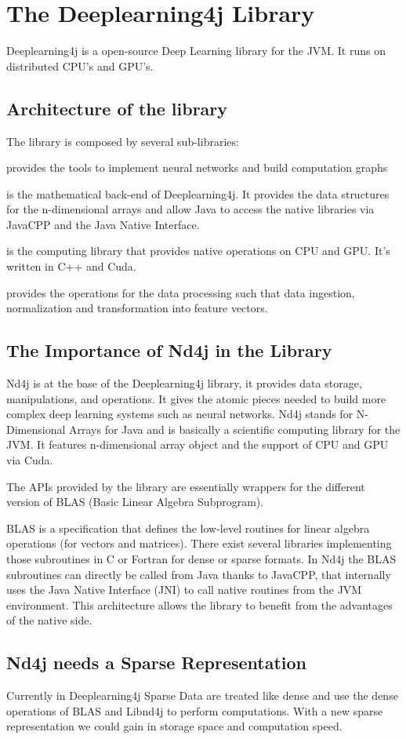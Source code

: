 \chapter{The Deeplearning4j Library}

Deeplearning4j is a open-source Deep Learning library for the {JVM}. It runs on distributed CPU's and GPU's.

\section{Architecture of the library}
The library is composed by several sub-libraries:

\begin{description}[leftmargin=!,labelwidth=\widthof{\bfseries Deeplearning4j}]
	\item [Deeplearning4j] provides the tools to implement neural networks and build computation graphs
	\item [Nd4j] is the mathematical back-end of Deeplearning4j. It provides the data structures for the n-dimensional arrays and allow Java to access the native libraries via JavaCPP and the Java Native Interface.
	\item [Libnd4j] is the computing library that provides native operations on CPU and GPU. It's written in C++ and Cuda.
	\item [Datavec] provides the operations for the data processing such that data ingestion, normalization and transformation into feature vectors.
\end{description}


\section{The Importance of Nd4j in the Library}

Nd4j is at the base of the Deeplearning4j library, it provides data storage, manipulations, and operations. It gives the atomic pieces needed to build more complex deep learning systems such as neural networks.  Nd4j stands for N-Dimensional Arrays for Java and is basically a scientific computing library for the JVM. It features n-dimensional array object and the support of CPU and GPU via Cuda. 

The APIs provided by the library are essentially wrappers for the different version of BLAS (Basic Linear Algebra Subprogram). 

BLAS is  a specification that defines the low-level routines for linear algebra operations (for vectors and matrices). There exist several libraries implementing those subroutines in C or Fortran for dense or sparse formats. In Nd4j the BLAS subroutines can directly be called from Java thanks to JavaCPP, that internally uses the Java Native Interface (JNI) to call native routines from the JVM environment. This architecture allows the library to benefit from the advantages of the native side.

\section{Nd4j needs a Sparse Representation}

Currently in Deeplearning4j Sparse Data are treated like dense and use the dense operations of BLAS and Libnd4j to perform computations. With a new sparse representation we could gain in storage space and computation speed.

